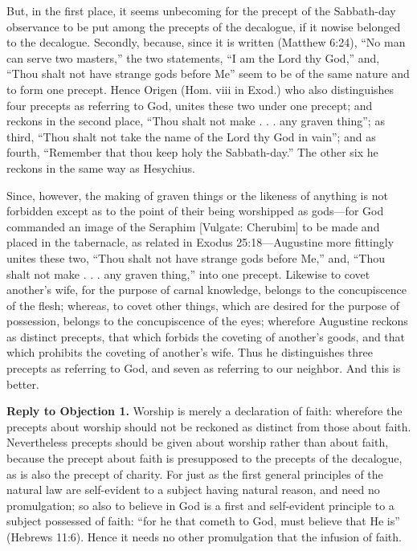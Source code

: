 But, in the first place, it seems unbecoming for the precept of the Sabbath-day observance to be put among the precepts of the decalogue, if it nowise belonged to the decalogue. Secondly, because, since it is written (Matthew 6:24), ``No man can serve two masters,'' the two statements, ``I am the Lord thy God,'' and, ``Thou shalt not have strange gods before Me'' seem to be of the same nature and to form one precept. Hence Origen (Hom. viii in Exod.) who also distinguishes four precepts as referring to God, unites these two under one precept; and reckons in the second place, ``Thou shalt not make . . . any graven thing''; as third, ``Thou shalt not take the name of the Lord thy God in vain''; and as fourth, ``Remember that thou keep holy the Sabbath-day.'' The other six he reckons in the same way as Hesychius.

Since, however, the making of graven things or the likeness of anything is not forbidden except as to the point of their being worshipped as gods—for God commanded an image of the Seraphim [Vulgate: Cherubim] to be made and placed in the tabernacle, as related in Exodus 25:18—Augustine more fittingly unites these two, ``Thou shalt not have strange gods before Me,'' and, ``Thou shalt not make . . . any graven thing,'' into one precept. Likewise to covet another's wife, for the purpose of carnal knowledge, belongs to the concupiscence of the flesh; whereas, to covet other things, which are desired for the purpose of possession, belongs to the concupiscence of the eyes; wherefore Augustine reckons as distinct precepts, that which forbids the coveting of another's goods, and that which prohibits the coveting of another's wife. Thus he distinguishes three precepts as referring to God, and seven as referring to our neighbor. And this is better.

\textbf{Reply to Objection 1.} Worship is merely a declaration of faith: wherefore the precepts about worship should not be reckoned as distinct from those about faith. Nevertheless precepts should be given about worship rather than about faith, because the precept about faith is presupposed to the precepts of the decalogue, as is also the precept of charity. For just as the first general principles of the natural law are self-evident to a subject having natural reason, and need no promulgation; so also to believe in God is a first and self-evident principle to a subject possessed of faith: ``for he that cometh to God, must believe that He is'' (Hebrews 11:6). Hence it needs no other promulgation that the infusion of faith.

